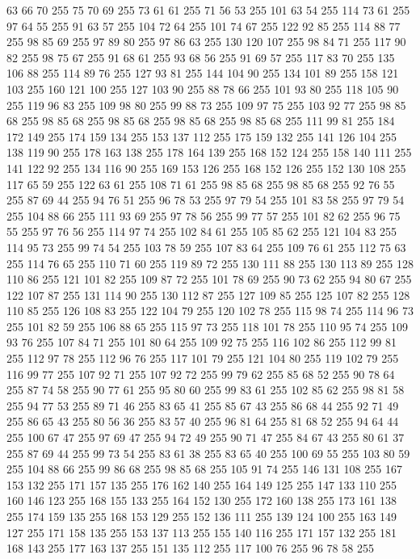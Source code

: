 63 66 70 255 75 70 69 255 73 61 61 255 71 56 53 255 101 63 54 255 114 73 61 255 97 64 55 255 91 63 57 255 104 72 64 255 101 74 67 255 122 92 85 255 114 88 77 255 98 85 69 255 97 89 80 255 97 86 63 255 130 120 107 255 98 84 71 255 117 90 82 255 98 75 67 255 91 68 61 255 93 68 56 255 91 69 57 255 117 83 70 255 135 106 88 255 114 89 76 255 127 93 81 255 144 104 90 255 134 101 89 255 158 121 103 255 160 121 100 255 127 103 90 255 88 78 66 255 101 93 80 255 118 105 90 255 119 96 83 255 109 98 80 255 99 88 73 255 109 97 75 255 103 92 77 255 98 85 68 255 98 85 68 255 98 85 68 255 98 85 68 255 98 85 68 255 111 99 81 255 184 172 149 255 174 159 134 255 153 137 112 255 175 159 132 255 141 126 104 255 138 119 90 255 178 163 138 255 178 164 139 255 168 152 124 255 158 140 111 255 141 122 92 255 134 116 90 255 169 153 126 255 168 152 126 255 152 130 108 255 117 65 59 255 122 63 61 255 108 71 61 255 98 85 68 255
98 85 68 255 92 76 55 255 87 69 44 255 94 76 51 255 96 78 53 255 97 79 54 255 101 83 58 255 97 79 54 255 104 88 66 255 111 93 69 255 97 78 56 255 99 77 57 255 101 82 62 255 96 75 55 255 97 76 56 255 114 97 74 255 102 84 61 255 105 85 62 255 121 104 83 255 114 95 73 255 99 74 54 255 103 78 59 255 107 83 64 255 109 76 61 255 112 75 63 255 114 76 65 255 110 71 60 255 119 89 72 255 130 111 88 255 130 113 89 255 128 110 86 255 121 101 82 255 109 87 72 255 101 78 69 255 90 73 62 255 94 80 67 255 122 107 87 255 131 114 90 255 130 112 87 255 127 109 85 255 125 107 82 255 128 110 85 255 126 108 83 255 122 104 79 255 120 102 78 255 115 98 74 255 114 96 73 255 101 82 59 255 106 88 65 255 115 97 73 255 118 101 78 255 110 95 74 255 109 93 76 255 107 84 71 255 101 80 64 255 109 92 75 255 116 102 86 255 112 99 81 255 112 97 78 255 112 96 76 255 117 101 79 255 121 104 80 255 119 102 79 255 116 99 77 255
107 92 71 255 107 92 72 255 99 79 62 255 85 68 52 255 90 78 64 255 87 74 58 255 90 77 61 255 95 80 60 255 99 83 61 255 102 85 62 255 98 81 58 255 94 77 53 255 89 71 46 255 83 65 41 255 85 67 43 255 86 68 44 255 92 71 49 255 86 65 43 255 80 56 36 255 83 57 40 255 96 81 64 255 81 68 52 255 94 64 44 255 100 67 47 255 97 69 47 255 94 72 49 255 90 71 47 255 84 67 43 255 80 61 37 255 87 69 44 255 99 73 54 255 83 61 38 255 83 65 40 255 100 69 55 255 103 80 59 255 104 88 66 255 99 86 68 255 98 85 68 255 105 91 74 255 146 131 108 255 167 153 132 255 171 157 135 255 176 162 140 255 164 149 125 255 147 133 110 255 160 146 123 255 168 155 133 255 164 152 130 255 172 160 138 255 173 161 138 255 174 159 135 255 168 153 129 255 152 136 111 255 139 124 100 255 163 149 127 255 171 158 135 255 153 137 113 255 155 140 116 255 171 157 132 255 181 168 143 255 177 163 137 255 151 135 112 255 117 100 76 255 96 78 58 255
